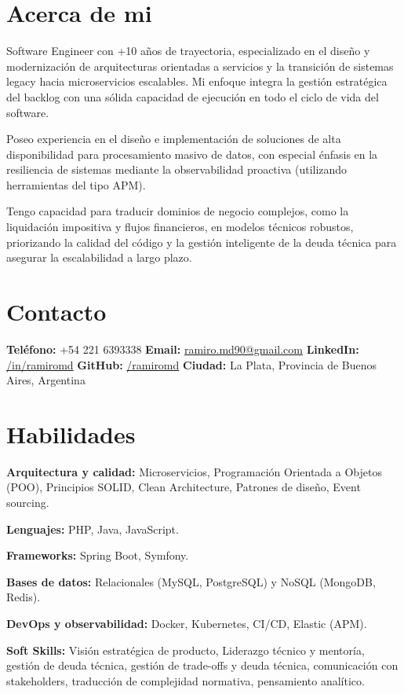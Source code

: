 \documentclass[10pt,a4paper]{article}
\begin{document}
	
	
	\section{Acerca de mi}

	
	Software Engineer con +10 años de trayectoria, especializado en el diseño y modernización de arquitecturas orientadas a servicios y la transición de sistemas legacy hacia microservicios escalables. Mi enfoque integra la gestión estratégica del backlog con una sólida capacidad de ejecución en todo el ciclo de vida del software.
	
	Poseo experiencia en el diseño e implementación de soluciones de alta disponibilidad para procesamiento  masivo de datos, con especial énfasis en la resiliencia de sistemas mediante la observabilidad proactiva (utilizando herramientas del tipo APM).
	
	Tengo capacidad para traducir dominios de negocio complejos, como la liquidación impositiva y flujos financieros, en modelos técnicos robustos, priorizando la calidad del código y la gestión inteligente de la deuda técnica para asegurar la escalabilidad a largo plazo.
	
	\section{Contacto}
	
	\begin{center}
		\small
		\textbf{Teléfono:} +54 221 6393338 \vline\hfill
		\textbf{Email:} \href{mailto:ramiro.md90@gmail.com}{ramiro.md90@gmail.com} \vline\hfill
		\textbf{LinkedIn:} \href{https://linkedin.com/in/ramiromd}{/in/ramiromd} \vline\hfill
		\textbf{GitHub:} \href{https://github.com/ramiromd}{/ramiromd} \vline\hfill
		\textbf{Ciudad:} La Plata, Provincia de Buenos Aires, Argentina
	\end{center}
	
	\section{Habilidades}
	{
		\setlength{\parindent}{0pt}
		
		\textbf{Arquitectura y calidad:} Microservicios, Programación Orientada a Objetos (POO), Principios SOLID, Clean Architecture, Patrones de diseño, Event sourcing.
		
		\textbf{Lenguajes:} PHP, Java, JavaScript.
		
		\textbf{Frameworks:} Spring Boot, Symfony.
		
		\textbf{Bases de datos:} Relacionales (MySQL, PostgreSQL) y NoSQL (MongoDB, Redis).
		
		\textbf{DevOps y observabilidad:} Docker, Kubernetes, CI/CD, Elastic (APM).
		
		\textbf{Soft Skills:}  Visión estratégica de producto, Liderazgo técnico y mentoría, gestión de deuda técnica, gestión de trade-offs y deuda técnica, comunicación con stakeholders, traducción de complejidad normativa, pensamiento analítico.
	}
	
\end{document}
